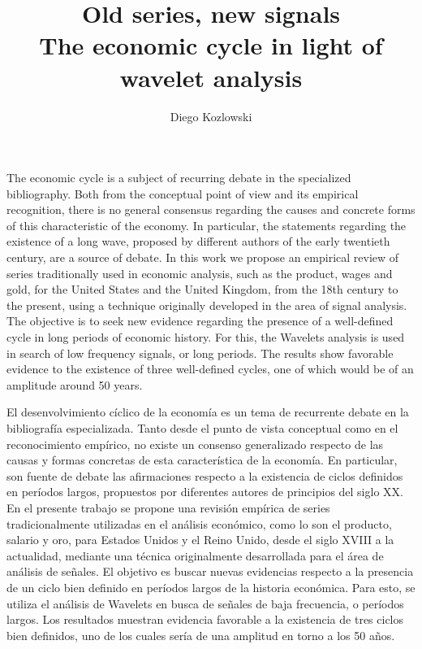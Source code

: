 \documentclass[a4paper]{article}
\title{Old series, new signals \\
	 {\large The economic cycle in light of wavelet analysis} }
\author[1]{Diego Kozlowski}
\affil[1]{Master in Data Mining \& Knowledge Discovery, FCEN-UBA \\ diegokoz92@gmail.com}
\date{}                     %
\renewenvironment{abstract}{
	\vspace*{\fill}
	\begin{center}%
		\bfseries\abstractname
\end{center}}%
{\vfill}
\begin{document}
\maketitle


	\begin{abstract}
	The economic cycle is a subject of recurring debate in the specialized bibliography. Both from the conceptual point of view and its empirical recognition, there is no general consensus regarding the causes and concrete forms of this characteristic of the economy. In particular, the statements regarding the existence of a long wave, proposed by different authors of the early twentieth century, are a source of debate. In this work we propose an empirical review of series traditionally used in economic analysis, such as the product, wages and gold, for the United States and the United Kingdom, from the 18th century to the present, using a technique originally developed in the area of ​​signal analysis. The objective is to seek new evidence regarding the presence of a well-defined cycle in long periods of economic history. For this, the Wavelets analysis is used in search of low frequency signals, or long periods. The results show favorable evidence to the existence of three well-defined cycles, one of which would be of an amplitude around 50 years.
	\end{abstract}

	\begin{abstract}
		El desenvolvimiento cíclico de la economía es un tema de recurrente debate en la bibliografía especializada. Tanto desde el punto de vista conceptual como en el reconocimiento empírico, no existe un consenso generalizado respecto de las causas y formas concretas de esta característica de la economía. En particular, son fuente de debate las afirmaciones respecto a la existencia de ciclos definidos en períodos largos, propuestos por diferentes autores de principios del siglo XX. En el presente trabajo se propone una revisión empírica de series tradicionalmente utilizadas en el análisis económico, como lo son el producto, salario y oro, para Estados Unidos y el Reino Unido, desde el siglo XVIII a la actualidad, mediante una técnica originalmente desarrollada para el área de análisis de señales. El objetivo es buscar nuevas evidencias respecto a la presencia de un ciclo bien definido en períodos largos de la historia económica. Para esto, se utiliza el análisis de Wavelets en busca de señales de baja frecuencia, o períodos largos. Los resultados muestran evidencia favorable a la existencia de tres ciclos bien definidos, uno de los cuales sería de una amplitud en torno a los 50 años.
	\end{abstract}
\end{document}
